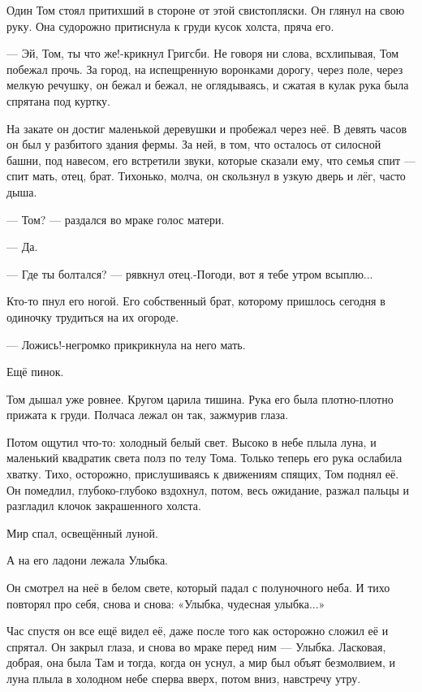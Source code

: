 Один Том стоял притихший в стороне от этой свистопляски. Он глянул на свою
руку. Она судорожно притиснула к груди кусок холста, пряча его.

— Эй, Том, ты что же!-крикнул Григсби. Не говоря ни слова, всхлипывая, Том
побежал прочь. За город, на испещренную воронками дорогу, через поле, через
мелкую речушку, он бежал и бежал, не оглядываясь, и сжатая в кулак рука была
спрятана под куртку.

На закате он достиг маленькой деревушки и пробежал через неё. В девять часов он
был у разбитого здания фермы. За ней, в том, что осталось от силосной башни,
под навесом, его встретили звуки, которые сказали ему, что семья спит — спит
мать, отец, брат. Тихонько, молча, он скользнул в узкую дверь и лёг, часто
дыша.

— Том? — раздался во мраке голос матери.

— Да.

— Где ты болтался? — рявкнул отец.-Погоди, вот я тебе утром всыплю...

Кто-то пнул его ногой. Его собственный брат, которому пришлось сегодня в
одиночку трудиться на их огороде.

— Ложись!-негромко прикрикнула на него мать.

Ещё пинок.

Том дышал уже ровнее. Кругом царила тишина. Рука его была плотно-плотно прижата
к груди. Полчаса лежал он так, зажмурив глаза.

Потом ощутил что-то: холодный белый свет. Высоко в небе плыла луна, и маленький
квадратик света полз по телу Тома. Только теперь его рука ослабила хватку.
Тихо, осторожно, прислушиваясь к движениям спящих, Том поднял её. Он помедлил,
глубоко-глубоко вздохнул, потом, весь ожидание, разжал пальцы и разгладил
клочок закрашенного холста.

Мир спал, освещённый луной.

А на его ладони лежала Улыбка.

Он смотрел на неё в белом свете, который падал с полуночного неба. И тихо
повторял про себя, снова и снова: «Улыбка, чудесная улыбка...»

Час спустя он все ещё видел её, даже после того как осторожно сложил её и
спрятал. Он закрыл глаза, и снова во мраке перед ним — Улыбка. Ласковая,
добрая, она была Там и тогда, когда он уснул, а мир был объят безмолвием, и
луна плыла в холодном небе сперва вверх, потом вниз, навстречу утру.
